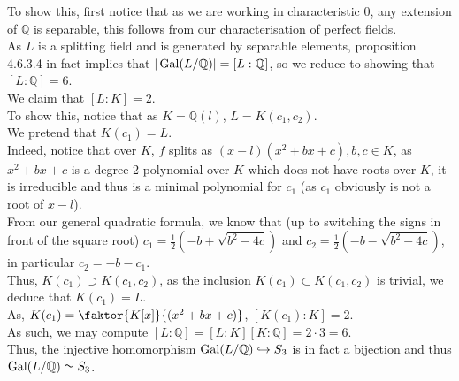 \documentclass[11pt, a4paper]{article}
\begin{document}
To show this, first notice that as we are working in characteristic 0, any extension of $\mathbb{Q}$ is separable, this follows from our characterisation of perfect fields.\\
As $L$ is a splitting field and is generated by separable elements, proposition 4.6.3.4 in fact implies that $|\operatorname{Gal}( L /\mathbb{Q}) | = [ L:\mathbb{Q}] $, so we reduce to showing that $ [ L: \mathbb{Q}] = 6$.\\
We claim that $ [ L:K] =2$.\\
To show this, notice that as $K = \mathbb{Q}(l) $, $L = K( c_1,c_2)$.\\
We pretend that $K( c_1) = L$.\\
Indeed, notice that over $K$, $f$ splits as $( x-l) ( x^{2}+bx+c), b,c\in K$, as $x^{2}+bx+c$ is a degree 2 polynomial over $K$ which does not have roots over $K$, it is irreducible and thus is a minimal polynomial for $c_1$ (as $c_1$ obviously is not a root of $x-l$).\\
From our general quadratic formula, we know that (up to switching the signs in front of the square root)  $c_1= \frac{1}{2} (-b + \sqrt{b^{2}-4c} ) $ and $c_2= \frac{1}{2}( -b- \sqrt{b^{2}-4c})$, in particular $c_2 = -b-c_1$.\\
Thus, $K( c_1) \supset K( c_1,c_2) $, as the inclusion $ K( c_1) \subset K( c_1,c_2)$ is trivial, we deduce that $K( c_1) = L$.\\
As, $K(c_1) = \faktor{K[x]}{( x^{2}+bx+c) }$, $[ K(c_1):K ]=2 $.\\
As such, we may compute  $ [ L:\mathbb{Q}]= [ L:K][K:\mathbb{Q}] = 2\cdot 3 = 6 $.\\
Thus, the injective homomorphism $  \operatorname{Gal}( L /\mathbb{Q}) \hookrightarrow S_3$ is in fact a bijection and thus $ \operatorname{Gal}( L /\mathbb{Q}) \simeq S_3$.
\end{document}
